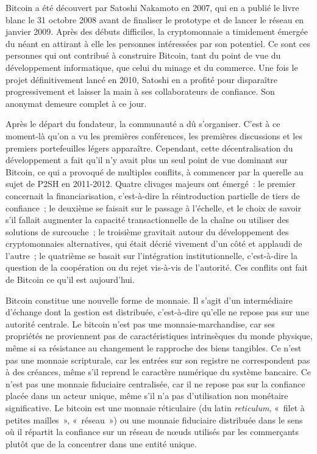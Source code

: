 Bitcoin a été découvert par Satoshi Nakamoto en 2007, qui en a publié le livre blanc le 31 octobre 2008 avant de finaliser le prototype et de lancer le réseau en janvier 2009. Après des débuts difficiles, la cryptomonnaie a timidement émergée du néant en attirant à elle les personnes intéressées par son potentiel. Ce sont ces personnes qui ont contribué à construire Bitcoin, tant du point de vue du développement informatique, que celui du minage et du commerce. Une fois le projet définitivement lancé en 2010, Satoshi en a profité pour disparaître progressivement et laisser la main à ses collaborateurs de confiance. Son anonymat demeure complet à ce jour.

Après le départ du fondateur, la communauté a dû s'organiser. C'est à ce moment-là qu'on a vu les premières conférences, les premières discussions et les premiers portefeuilles légers apparaître. Cependant, cette décentralisation du développement a fait qu'il n'y avait plus un seul point de vue dominant sur Bitcoin, ce qui a provoqué de multiples conflits, à commencer par la querelle au sujet de P2SH en 2011-2012. Quatre clivages majeurs ont émergé~: le premier concernait la financiarisation, c'est-à-dire la réintroduction partielle de tiers de confiance~; le deuxième se faisait sur le passage à l'échelle, et le choix de savoir s'il fallait augmenter la capacité transactionnelle de la chaîne ou utiliser des solutions de surcouche~; le troisième gravitait autour du développement des cryptomonnaies alternatives, qui était décrié vivement d'un côté et applaudi de l'autre~; le quatrième se basait sur l'intégration institutionnelle, c'est-à-dire la question de la coopération ou du rejet vis-à-vis de l'autorité. Ces conflits ont fait de Bitcoin ce qu'il est aujourd'hui.

Bitcoin constitue une nouvelle forme de monnaie. Il s'agit d'un intermédiaire d'échange dont la gestion est distribuée, c'est-à-dire qu'elle ne repose pas sur une autorité centrale. Le bitcoin n'est pas une monnaie-marchandise, car ses propriétés ne proviennent pas de caractéristiques intrinsèques du monde physique, même si sa résistance au changement le rapproche des biens tangibles. Ce n'est pas une monnaie scripturale, car les entrées sur son registre ne correspondent pas à des créances, même s'il reprend le caractère numérique du système bancaire. Ce n'est pas une monnaie fiduciaire centralisée, car il ne repose pas sur la confiance placée dans un acteur unique, même s'il n'a pas d'utilisation non monétaire significative. Le bitcoin est une monnaie réticulaire (du latin \emph{reticulum}, «~filet à petites mailles~», «~réseau~») ou une monnaie fiduciaire distribuée dans le sens où il répartit la confiance sur un réseau de nœuds utilisés par les commerçants plutôt que de la concentrer dans une entité unique.

